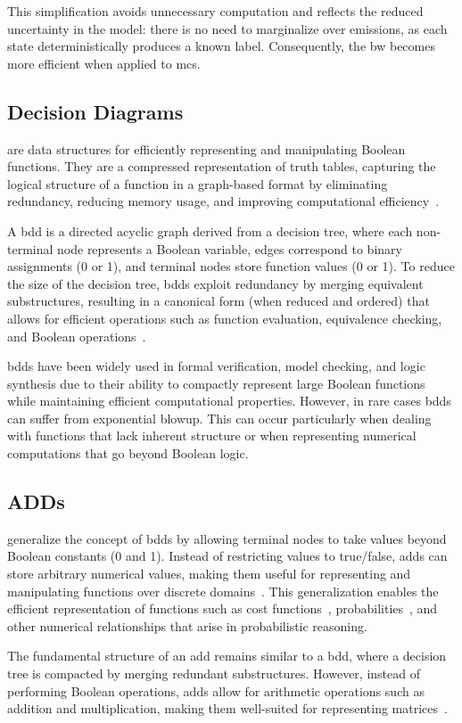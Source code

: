 This simplification avoids unnecessary computation and reflects the reduced uncertainty in the model: there is no need to marginalize over emissions, as each state deterministically produces a known label.
Consequently, the \gls{bw} becomes more efficient when applied to \glspl{mc}.

\subsection{Decision Diagrams}\label{subsec:decision-diagrams}
 are data structures for efficiently representing and manipulating Boolean functions.
They are a compressed representation of truth tables, capturing the logical structure of a function in a graph-based format by eliminating redundancy, reducing memory usage, and improving computational efficiency~\cite{bryant1986graph}.

A \gls{bdd} is a directed acyclic graph derived from a decision tree, where each non-terminal node represents a Boolean variable, edges correspond to binary assignments (0 or 1), and terminal nodes store function values (0 or 1).
To reduce the size of the decision tree, \glspl{bdd} exploit redundancy by merging equivalent substructures, resulting in a canonical form (when reduced and ordered) that allows for efficient operations such as function evaluation, equivalence checking, and Boolean operations~\cite{bryant1986graph}.

\glspl{bdd} have been widely used in formal verification, model checking, and logic synthesis due to their ability to compactly represent large Boolean functions while maintaining efficient computational properties.
However, in rare cases \glspl{bdd} can suffer from exponential blowup. This can occur particularly when dealing with functions that lack inherent structure or when representing numerical computations that go beyond Boolean logic.

\subsection{ADDs}\label{subsec:adds}
 generalize the concept of \glspl{bdd} by allowing terminal nodes to take values beyond Boolean constants (0 and 1).
Instead of restricting values to true/false, \glspl{add} can store arbitrary numerical values, making them useful for representing and manipulating functions over discrete domains~\cite{bahar1997algebric}.
This generalization enables the efficient representation of functions such as cost functions~\cite{kwiatkowska2004probabilistic}, probabilities~\cite{baier1997symbolic}, and other numerical relationships that arise in probabilistic reasoning.

The fundamental structure of an \gls{add} remains similar to a \gls{bdd}, where a decision tree is compacted by merging redundant substructures.
However, instead of performing Boolean operations, \glspl{add} allow for arithmetic operations such as addition and multiplication, making them well-suited for representing matrices~\cite{bahar1997algebric}.
